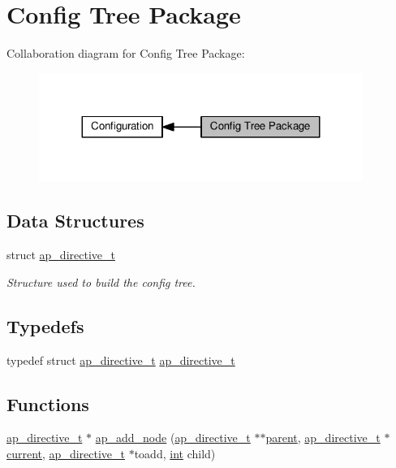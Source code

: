 \hypertarget{group__APACHE__CORE__CONFIG__TREE}{}\section{Config Tree Package}
\label{group__APACHE__CORE__CONFIG__TREE}
Collaboration diagram for Config Tree Package\+:
\nopagebreak
\begin{figure}[H]
\begin{center}
\leavevmode
\includegraphics[width=299pt]{group__APACHE__CORE__CONFIG__TREE}
\end{center}
\end{figure}
\subsection*{Data Structures}
\begin{DoxyCompactItemize}
\item 
struct \hyperlink{structap__directive__t}{ap\+\_\+directive\+\_\+t}
\begin{DoxyCompactList}\small\item\em Structure used to build the config tree. \end{DoxyCompactList}\end{DoxyCompactItemize}
\subsection*{Typedefs}
\begin{DoxyCompactItemize}
\item 
typedef struct \hyperlink{structap__directive__t}{ap\+\_\+directive\+\_\+t} \hyperlink{group__APACHE__CORE__CONFIG__TREE_ga7c3b646fd4dc997589ecfa1aaacac838}{ap\+\_\+directive\+\_\+t}
\end{DoxyCompactItemize}
\subsection*{Functions}
\begin{DoxyCompactItemize}
\item 
\hyperlink{structap__directive__t}{ap\+\_\+directive\+\_\+t} $\ast$ \hyperlink{group__APACHE__CORE__CONFIG__TREE_ga0f93d976ae59015db6b7ce0365cbb4a2}{ap\+\_\+add\+\_\+node} (\hyperlink{structap__directive__t}{ap\+\_\+directive\+\_\+t} $\ast$$\ast$\hyperlink{group__apr__pools_ga3eb8c52002440da9a3eed11d54d08dd5}{parent}, \hyperlink{structap__directive__t}{ap\+\_\+directive\+\_\+t} $\ast$\hyperlink{group__APACHE__CORE__CONFIG_ga4b3e87cb39cac2296c5083f27321f1f4}{current}, \hyperlink{structap__directive__t}{ap\+\_\+directive\+\_\+t} $\ast$toadd, \hyperlink{pcre_8txt_a42dfa4ff673c82d8efe7144098fbc198}{int} child)
\end{DoxyCompactItemize}
